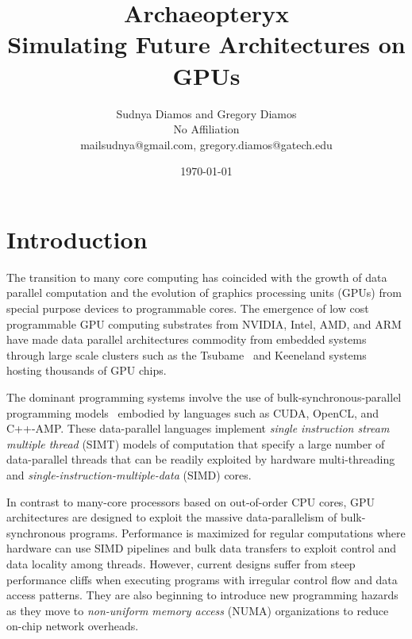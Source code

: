 \documentclass[conference, 10pt]{IEEEtran}
\begin{document}
 

\title{Archaeopteryx\\
Simulating Future Architectures on GPUs}

\author{Sudnya Diamos and Gregory Diamos  \\
No Affiliation \\
{\small mailsudnya@gmail.com, gregory.diamos@gatech.edu}}
\date{\today}

\maketitle

\section{Introduction}
\label{sec:introduction}

The transition to many core computing has coincided with the growth of
data parallel computation and the evolution of graphics processing
units (GPUs) from special purpose devices to programmable cores. 
The emergence of low cost programmable GPU computing substrates from
NVIDIA, Intel, AMD, and ARM have made data parallel architectures commodity
from embedded systems through large scale clusters such as the
Tsubame~\cite{ref:tsubame} and Keeneland systems~\cite{ref:keeneland}
hosting thousands of GPU chips.

The dominant programming systems involve the use of
bulk-synchronous-parallel programming models~\cite{ref:bulk-synchronous}
embodied by languages such as CUDA, OpenCL, and C++-AMP.  These data-parallel
languages implement \textit{single instruction stream multiple thread} (SIMT)
models of computation that specify a large number of
data-parallel threads that can be readily exploited by hardware
multi-threading and \textit{single-instruction-multiple-data} (SIMD)
cores. 

In contrast to many-core processors based on out-of-order CPU cores,
GPU architectures are designed to exploit the massive data-parallelism of
bulk-synchronous programs. Performance is maximized for regular computations
where hardware can use SIMD pipelines and bulk data transfers to exploit
control and data locality among threads.  However, current designs suffer
from steep performance cliffs when executing programs with irregular control
flow and data access patterns.  
They are also beginning to introduce new
programming hazards as they move to \textit{non-uniform memory access} (NUMA)
organizations to reduce on-chip network overheads.  
\end{document}
